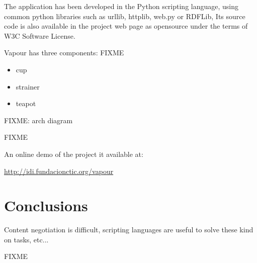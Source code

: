 The application has been developed in the Python scripting language, using common
python libraries such as urllib, httplib, web.py or RDFLib, Its source code is 
also available in the project web page as opensource under the terms of W3C Software 
License.

Vapour has three components: FIXME
\begin{itemize}
 \item cup
 \item strainer
 \item teapot
\end{itemize}

FIXME: arch diagram

FIXME

An online demo of the project it available at: 
\begin{center}\url{http://idi.fundacionctic.org/vapour}\end{center}

\section{Conclusions}

Content negotiation is difficult, scripting languages are useful to solve these kind on tasks, etc...

FIXME

